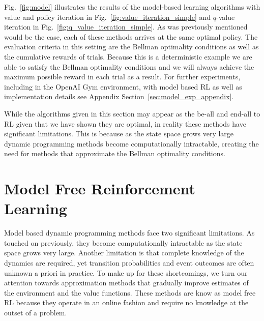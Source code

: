 \documentclass{article}
\begin{document}
Fig.~\ref{fig:model} illustrates the results of the model-based learning algorithms with value and policy iteration in Fig.~\ref{fig:value_iteration_simple} and $q$-value iteration in Fig.~\ref{fig:q_value_iteration_simple}. As was previously mentioned would be the case, each of these methods arrives at the same optimal policy. The evaluation criteria in this setting are the Bellman optimality conditions as well as the cumulative rewards of trials. Because this is a deterministic example we are able to satisfy the Bellman optimality conditions and we will always achieve the maximum possible reward in each trial as a result. For further experiments, including in the OpenAI Gym environment, with model based RL as well as implementation details see Appendix Section~\ref{sec:model_exp_appendix}.

While the algorithms given in this section may appear as the be-all and end-all to RL given that we have shown they are optimal, in reality these methods have significant limitations. This is because as the state space grows very large dynamic programming methods become computationally intractable, creating the need for methods that approximate the Bellman optimality conditions. 

\section{Model Free Reinforcement Learning}\label{sec:model_free}
Model based dynamic programming methods face two significant limitations. As touched on previously, they become computationally intractable as the state space grows very large. Another limitation is that complete knowledge of the dynamics are required, yet transition probabilities and event outcomes are often unknown a priori in practice. To make up for these shortcomings, we turn our attention towards approximation methods that gradually improve estimates of the environment and the value functions. These methods are know as model free RL because they operate in an online fashion and require no knowledge at the outset of a problem.
\end{document}
